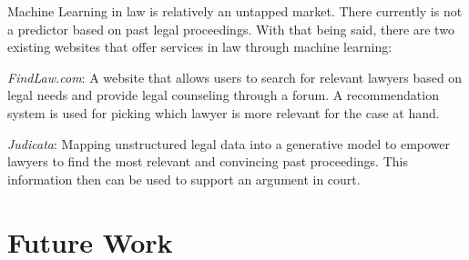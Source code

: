 \documentclass[journal]{IEEEtran}
\begin{document}
Machine Learning in law is relatively an untapped market. There currently is not a predictor based on past legal proceedings. With that being said, there are two existing websites that offer services in law through machine learning:

\textit{FindLaw.com}: A website that allows users to search for relevant lawyers based on legal needs and  provide legal counseling through a forum. A recommendation system is used for picking which lawyer is more relevant for the case at hand.

\textit{Judicata}: Mapping unstructured legal data into a generative model to empower lawyers to find the most relevant and convincing past proceedings. This information then can be used to support an argument in court.

\section{Future Work}

\end{document}
